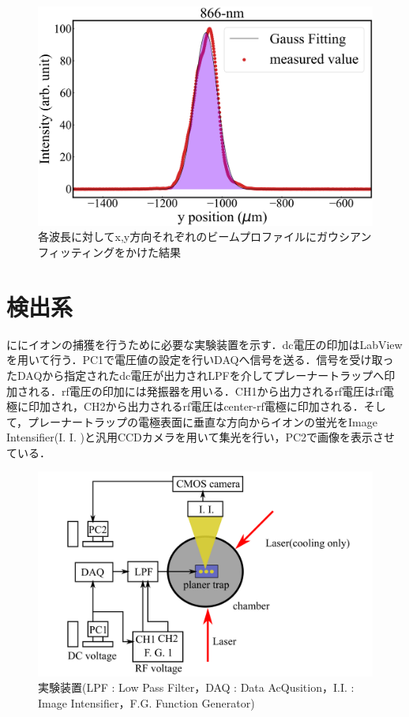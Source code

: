 \begin{figure}[h]
\begin{center}
\begin{minipage}{0.48\linewidth}
\begin{center}
		\includegraphics[width = 0.98\columnwidth]{./experimental_setup/figure/866GaussianFittingYpos.jpg}
	\end{center}
	\end{minipage}
	\caption{各波長に対してx,y方向それぞれのビームプロファイルにガウシアンフィッティングをかけた結果}
	\label{fig:GaussianFitting}
	\end{center}
\end{figure}
%
\clearpage
%
\section{検出系}
ににイオンの捕獲を行うために必要な実験装置を示す．dc電圧の印加はLabViewを用いて行う．PC1で電圧値の設定を行いDAQへ信号を送る．信号を受け取ったDAQから指定されたdc電圧が出力されLPFを介してプレーナートラップへ印加される．rf電圧の印加には発振器を用いる．CH1から出力されるrf電圧はrf電極に印加され，CH2から出力されるrf電圧はcenter-rf電極に印加される．そして，プレーナートラップの電極表面に垂直な方向からイオンの蛍光をImage Intensifier(I. I. )と汎用CCDカメラを用いて集光を行い，PC2で画像を表示させている．

\begin{figure}[h]
	\begin{center}
		\includegraphics[width = 0.6\linewidth]{./experimental_setup/figure/Detect.png}
		\caption{実験装置(LPF : Low Pass Filter，DAQ : Data AcQusition，I.I. : Image Intensifier，F.G. Function Generator)}
		\label{fig:Detect}
	\end{center}
\end{figure}